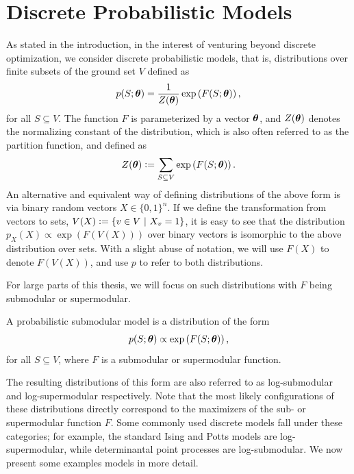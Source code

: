 \section{Discrete Probabilistic Models}
As stated in the introduction, in the interest of venturing beyond discrete optimization, we consider discrete probabilistic models, that is, distributions over finite subsets of the ground set $V$ defined as
\begin{align*}
p(S; \bm{\theta}) = \frac{1}{Z(\bm{\theta})} \exp\left( F(S; \bm{\theta}) \right),
\end{align*}
for all $S \subseteq V$.
The function $F$ is parameterized by a vector $\bm{\theta}$, and $Z(\bm{\theta})$ denotes the normalizing constant of the distribution, which is also often referred to as the partition function, and defined as
\begin{align*}
Z(\bm{\theta}) \vcentcolon= \sum_{S \subseteq V} \exp\left( F(S; \bm{\theta}) \right).
\end{align*}
An alternative and equivalent way of defining distributions of the above form is via binary random vectors $X \in \{0, 1\}^n$.
If we define the transformation from vectors to sets, $V(X) \vcentcolon= \left\{v \in V\ \middle\vert\  X_v = 1\right\}$, it is easy to see that the distribution $p_X(X) \propto \exp(F(V(X)))$ over binary vectors is isomorphic to the above distribution over sets.
With a slight abuse of notation, we will use $F(X)$ to denote $F(V(X))$, and use $p$ to refer to both distributions.

For large parts of this thesis, we will focus on such distributions with $F$ being submodular or supermodular.
\begin{definition}
A probabilistic submodular model \citep{djolonga14,gotovos15} is a distribution of the form
\begin{align*}
p(S; \bm{\theta}) \propto \exp\left( F(S; \bm{\theta}) \right),
\end{align*}
for all $S \subseteq V$, where $F$ is a submodular or supermodular function.
\end{definition}
The resulting distributions of this form are also referred to as log-sub\-mo\-du\-lar and log-supermodular respectively.
Note that the most likely configurations of these distributions directly correspond to the maximizers of the sub- or supermodular function $F$.
Some commonly used discrete models fall under these categories; for example, the standard Ising and Potts models are log-supermodular, while determinantal point processes are log-submodular.
We now present some examples models in more detail.

